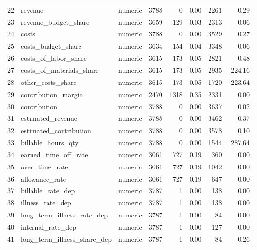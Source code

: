 \begin{sidewaystable}[ht]
\begin{tabular}{rllrrrrr}
  22 & revenue & numeric & 3788 &   0 & 0.00 & 2261 & 0.29 \\ 
  23 & revenue\_budget\_share & numeric & 3659 & 129 & 0.03 & 2313 & 0.06 \\ 
  24 & costs & numeric & 3788 &   0 & 0.00 & 3529 & 0.27 \\ 
  25 & costs\_budget\_share & numeric & 3634 & 154 & 0.04 & 3348 & 0.06 \\ 
  26 & costs\_of\_labor\_share & numeric & 3615 & 173 & 0.05 & 2821 & 0.48 \\ 
  27 & costs\_of\_materials\_share & numeric & 3615 & 173 & 0.05 & 2935 & 224.16 \\ 
  28 & other\_costs\_share & numeric & 3615 & 173 & 0.05 & 1720 & -223.64 \\ 
  29 & contribution\_margin & numeric & 2470 & 1318 & 0.35 & 2331 & 0.00 \\ 
  30 & contribution & numeric & 3788 &   0 & 0.00 & 3637 & 0.02 \\ 
  31 & estimated\_revenue & numeric & 3788 &   0 & 0.00 & 3462 & 0.37 \\ 
  32 & estimated\_contribution & numeric & 3788 &   0 & 0.00 & 3578 & 0.10 \\ 
  33 & billable\_hours\_qty & numeric & 3788 &   0 & 0.00 & 1544 & 287.64 \\ 
  34 & earned\_time\_off\_rate & numeric & 3061 & 727 & 0.19 & 360 & 0.00 \\ 
  35 & over\_time\_rate & numeric & 3061 & 727 & 0.19 & 1042 & 0.00 \\ 
  36 & allowance\_rate & numeric & 3061 & 727 & 0.19 & 647 & 0.00 \\ 
  37 & billable\_rate\_dep & numeric & 3787 &   1 & 0.00 & 138 & 0.00 \\ 
  38 & illness\_rate\_dep & numeric & 3787 &   1 & 0.00 & 138 & 0.00 \\ 
  39 & long\_term\_illness\_rate\_dep & numeric & 3787 &   1 & 0.00 &  84 & 0.00 \\ 
  40 & internal\_rate\_dep & numeric & 3787 &   1 & 0.00 & 127 & 0.00 \\ 
  41 & long\_term\_illness\_share\_dep & numeric & 3787 &   1 & 0.00 &  84 & 0.26 \\ 
   \hline
\end{tabular}
\end{sidewaystable}
